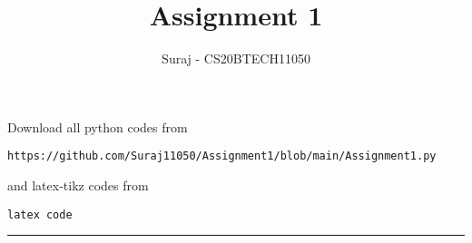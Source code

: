 \documentclass[journal,12pt,twocolumn]{IEEEtran}
\DeclareMathOperator*{\Res}{Res}
\begin{document}
\newcommand{\BEQA}{\begin{eqnarray}}
\newcommand{\EEQA}{\end{eqnarray}}
\newcommand{\define}{\stackrel{\triangle}{=}}

\raggedbottom
\setlength{\parindent}{0pt}
\providecommand{\mbf}{\mathbf}
\providecommand{\pr}[1]{\ensuremath{\Pr\left(#1\right)}}
\providecommand{\qfunc}[1]{\ensuremath{Q\left(#1\right)}}
\providecommand{\sbrak}[1]{\ensuremath{{}\left[#1\right]}}
\providecommand{\lsbrak}[1]{\ensuremath{{}\left[#1\right.}}
\providecommand{\rsbrak}[1]{\ensuremath{{}\left.#1\right]}}
\providecommand{\brak}[1]{\ensuremath{\left(#1\right)}}
\providecommand{\lbrak}[1]{\ensuremath{\left(#1\right.}}
\providecommand{\rbrak}[1]{\ensuremath{\left.#1\right)}}
\providecommand{\cbrak}[1]{\ensuremath{\left\{#1\right\}}}
\providecommand{\lcbrak}[1]{\ensuremath{\left\{#1\right.}}
\providecommand{\rcbrak}[1]{\ensuremath{\left.#1\right\}}}
\theoremstyle{remark}
\newtheorem{rem}{Remark}
\newcommand{\sgn}{\mathop{\mathrm{sgn}}}
\providecommand{\abs}[1]{\vert#1\vert}
\providecommand{\res}[1]{\Res\displaylimits_{#1}} 
\providecommand{\norm}[1]{\lVert#1\rVert}
\providecommand{\mtx}[1]{\mathbf{#1}}
\providecommand{\mean}[1]{E[ #1 ]}
\providecommand{\fourier}{\overset{\mathcal{F}}{ \rightleftharpoons}}
\providecommand{\system}{\overset{\mathcal{H}}{ \longleftrightarrow}}
\newcommand{\solution}{\noindent \textbf{Solution: }}
\newcommand{\cosec}{\,\text{cosec}\,}
\providecommand{\dec}[2]{\ensuremath{\overset{#1}{\underset{#2}{\gtrless}}}}
\newcommand{\myvec}[1]{\ensuremath{\begin{pmatrix}#1\end{pmatrix}}}
\newcommand{\mydet}[1]{\ensuremath{\begin{vmatrix}#1\end{vmatrix}}}
\makeatletter
{}
\makeatother
\let\StandardTheFigure\thefigure
\let\vec\mathbf
\renewcommand{\thefigure}{\theproblem}
\def\putbox#1#2#3{\makebox[0in][l]{\makebox[#1][l]{}\raisebox{\baselineskip}[0in][0in]{\raisebox{#2}[0in][0in]{#3}}}}
     \def\rightbox#1{\makebox[0in][r]{#1}}
     \def\centbox#1{\makebox[0in]{#1}}
     \def\topbox#1{\raisebox{-\baselineskip}[0in][0in]{#1}}
     \def\midbox#1{\raisebox{-0.5\baselineskip}[0in][0in]{#1}}
\vspace{3cm}
\title{Assignment 1}
\author{Suraj - CS20BTECH11050}
\maketitle
\newpage
\bigskip
\renewcommand{\thefigure}{\theenumi}
\renewcommand{\thetable}{\theenumi}
Download all python codes from 
\begin{lstlisting}
https://github.com/Suraj11050/Assignment1/blob/main/Assignment1.py
\end{lstlisting}
%
and latex-tikz codes from 
%
\begin{lstlisting}
latex code
\end{lstlisting}
%
\hrule
%
\end{document}
